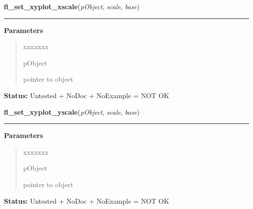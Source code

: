 \hspace{.8\funcindent}\begin{boxedminipage}{\funcwidth}

    \raggedright \textbf{fl\_set\_xyplot\_xscale}(\textit{pObject}, \textit{scale}, \textit{base})

    \vspace{-1.5ex}

    \rule{\textwidth}{0.5\fboxrule}
\setlength{\parskip}{2ex}
\setlength{\parskip}{1ex}
      \textbf{Parameters}
      \vspace{-1ex}

      \begin{quote}
        \begin{Ventry}{xxxxxxx}

          \item[pObject]

          pointer to object

        \end{Ventry}

      \end{quote}

\textbf{Status:} Untested + NoDoc + NoExample = NOT OK



    \end{boxedminipage}

    \label{xformslib:library:fl_set_xyplot_yscale}

    \vspace{0.5ex}

\hspace{.8\funcindent}\begin{boxedminipage}{\funcwidth}

    \raggedright \textbf{fl\_set\_xyplot\_yscale}(\textit{pObject}, \textit{scale}, \textit{base})

    \vspace{-1.5ex}

    \rule{\textwidth}{0.5\fboxrule}
\setlength{\parskip}{2ex}
\setlength{\parskip}{1ex}
      \textbf{Parameters}
      \vspace{-1ex}

      \begin{quote}
        \begin{Ventry}{xxxxxxx}

          \item[pObject]

          pointer to object

        \end{Ventry}

      \end{quote}

\textbf{Status:} Untested + NoDoc + NoExample = NOT OK



    \end{boxedminipage}

